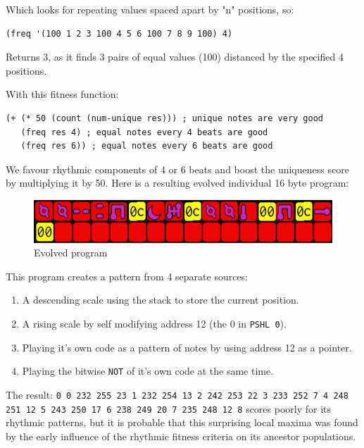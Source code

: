 \documentclass[letterpaper, 12pt]{article}
\begin{document}
Which looks for repeating values spaced apart by "n" positions, so:

\begin{Verbatim}[fontfamily=courier, xleftmargin=\parindent]
(freq '(100 1 2 3 100 4 5 6 100 7 8 9 100) 4) 
\end{Verbatim}

Returns 3, as it finds 3 pairs of equal values (100) distanced by the specified 4 positions.

With this fitness function:

\begin{Verbatim}[fontfamily=courier, xleftmargin=\parindent]
(+ (* 50 (count (num-unique res))) ; unique notes are very good
   (freq res 4) ; equal notes every 4 beats are good
   (freq res 6)) ; equal notes every 6 beats are good
\end{Verbatim}

We favour rhythmic components of 4 or 6 beats and boost the uniqueness score by multiplying it by 50. Here is a resulting evolved individual 16 byte program:

\begin{figure}
	\centering
		\includegraphics[width=13cm]{evolved}
	\caption{Evolved program}
	\label{fig:evolved}
\end{figure}

This program creates a pattern from 4 separate sources:

\begin{enumerate}
\item A descending scale using the stack to store the current position.
\item A rising scale by self modifying address 12 (the 0 in \texttt{PSHL 0}).
\item Playing it's own code as a pattern of notes by using address 12 as a pointer.
\item Playing the bitwise \texttt{NOT} of it's own code at the same time.
\end{enumerate}

The result: \texttt{0 0 232 255 23 1 232 254 13 2 242 253 22 3 233 252 7 4 248 251 12 5 243 250 17 6 238 249 20 7 235 248 12 8} scores poorly for its rhythmic patterns, but it is probable that this surprising local maxima was found by the early influence of the rhythmic fitness criteria on its ancestor populations. 
\end{document}
